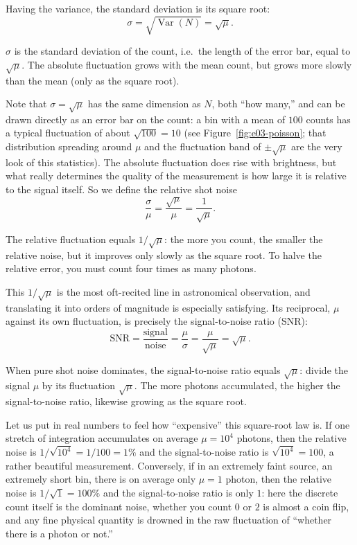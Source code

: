 Having the variance, the standard deviation is its square root:
\begin{equation}
  \sigma=\sqrt{\operatorname{Var}(N)}=\sqrt{\mu}.
  \label{eq:e03-sigma}
\end{equation}
\begin{formulaexplain}
$\sigma$ is the standard deviation of the count, i.e.\ the length of the error bar, equal to $\sqrt{\mu}$. The absolute fluctuation grows with the mean count, but grows more slowly than the mean (only as the square root).
\end{formulaexplain}
Note that $\sigma=\sqrt{\mu}$ has the same dimension as $N$, both ``how many,'' and can be drawn directly as an error bar on the count: a bin with a mean of $100$ counts has a typical fluctuation of about $\sqrt{100}=10$ (see Figure~\ref{fig:e03-poisson}; that distribution spreading around $\mu$ and the fluctuation band of $\pm\sqrt{\mu}$ are the very look of this statistics). The absolute fluctuation does rise with brightness, but what really determines the quality of the measurement is how large it is relative to the signal itself. So we define the relative shot noise
\begin{equation}
  \frac{\sigma}{\mu}=\frac{\sqrt{\mu}}{\mu}=\frac{1}{\sqrt{\mu}} .
  \label{eq:e03-relative}
\end{equation}
\begin{formulaexplain}
The relative fluctuation equals $1/\sqrt{\mu}$: the more you count, the smaller the relative noise, but it improves only slowly as the square root. To halve the relative error, you must count four times as many photons.
\end{formulaexplain}
This $1/\sqrt{\mu}$ is the most oft-recited line in astronomical observation, and translating it into orders of magnitude is especially satisfying. Its reciprocal, $\mu$ against its own fluctuation, is precisely the signal-to-noise ratio (SNR):
\begin{equation}
  \mathrm{SNR}=\frac{\text{signal}}{\text{noise}}=\frac{\mu}{\sigma}=\frac{\mu}{\sqrt{\mu}}=\sqrt{\mu}.
  \label{eq:e03-snr}
\end{equation}
\begin{formulaexplain}
When pure shot noise dominates, the signal-to-noise ratio equals $\sqrt{\mu}$: divide the signal $\mu$ by its fluctuation $\sqrt{\mu}$. The more photons accumulated, the higher the signal-to-noise ratio, likewise growing as the square root.
\end{formulaexplain}
Let us put in real numbers to feel how ``expensive'' this square-root law is. If one stretch of integration accumulates on average $\mu=10^{4}$ photons, then the relative noise is $1/\sqrt{10^4}=1/100=1\%$ and the signal-to-noise ratio is $\sqrt{10^4}=100$, a rather beautiful measurement. Conversely, if in an extremely faint source, an extremely short bin, there is on average only $\mu=1$ photon, then the relative noise is $1/\sqrt{1}=100\%$ and the signal-to-noise ratio is only $1$: here the discrete count itself is the dominant noise, whether you count $0$ or $2$ is almost a coin flip, and any fine physical quantity is drowned in the raw fluctuation of ``whether there is a photon or not.''

